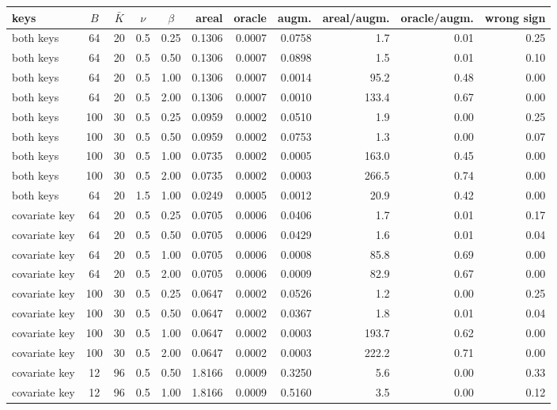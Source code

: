 \documentclass[11pt]{article}
\theoremstyle{definition}
\begin{document}
\begin{table}[t]\centering\footnotesize\setlength{\tabcolsep}{4pt}
\begin{tabular}{lcccc rrr rrr}\toprule
keys & $B$ & $\bar K$ & $\nu$ & $\beta$ & areal & oracle & augm. & areal/augm. & oracle/augm. & wrong sign\\\midrule
both keys & 64 & 20 & 0.5 & 0.25 & 0.1306 & 0.0007 & 0.0758 & 1.7 & 0.01 & 0.25\\
both keys & 64 & 20 & 0.5 & 0.50 & 0.1306 & 0.0007 & 0.0898 & 1.5 & 0.01 & 0.10\\
both keys & 64 & 20 & 0.5 & 1.00 & 0.1306 & 0.0007 & 0.0014 & 95.2 & 0.48 & 0.00\\
both keys & 64 & 20 & 0.5 & 2.00 & 0.1306 & 0.0007 & 0.0010 & 133.4 & 0.67 & 0.00\\
both keys & 100 & 30 & 0.5 & 0.25 & 0.0959 & 0.0002 & 0.0510 & 1.9 & 0.00 & 0.25\\
both keys & 100 & 30 & 0.5 & 0.50 & 0.0959 & 0.0002 & 0.0753 & 1.3 & 0.00 & 0.07\\
both keys & 100 & 30 & 0.5 & 1.00 & 0.0735 & 0.0002 & 0.0005 & 163.0 & 0.45 & 0.00\\
both keys & 100 & 30 & 0.5 & 2.00 & 0.0735 & 0.0002 & 0.0003 & 266.5 & 0.74 & 0.00\\
both keys & 64 & 20 & 1.5 & 1.00 & 0.0249 & 0.0005 & 0.0012 & 20.9 & 0.42 & 0.00\\
covariate key & 64 & 20 & 0.5 & 0.25 & 0.0705 & 0.0006 & 0.0406 & 1.7 & 0.01 & 0.17\\
covariate key & 64 & 20 & 0.5 & 0.50 & 0.0705 & 0.0006 & 0.0429 & 1.6 & 0.01 & 0.04\\
covariate key & 64 & 20 & 0.5 & 1.00 & 0.0705 & 0.0006 & 0.0008 & 85.8 & 0.69 & 0.00\\
covariate key & 64 & 20 & 0.5 & 2.00 & 0.0705 & 0.0006 & 0.0009 & 82.9 & 0.67 & 0.00\\
covariate key & 100 & 30 & 0.5 & 0.25 & 0.0647 & 0.0002 & 0.0526 & 1.2 & 0.00 & 0.25\\
covariate key & 100 & 30 & 0.5 & 0.50 & 0.0647 & 0.0002 & 0.0367 & 1.8 & 0.01 & 0.04\\
covariate key & 100 & 30 & 0.5 & 1.00 & 0.0647 & 0.0002 & 0.0003 & 193.7 & 0.62 & 0.00\\
covariate key & 100 & 30 & 0.5 & 2.00 & 0.0647 & 0.0002 & 0.0003 & 222.2 & 0.71 & 0.00\\
covariate key & 12 & 96 & 0.5 & 0.50 & 1.8166 & 0.0009 & 0.3250 & 5.6 & 0.00 & 0.33\\
covariate key & 12 & 96 & 0.5 & 1.00 & 1.8166 & 0.0009 & 0.5160 & 3.5 & 0.00 & 0.12\\

\end{tabular}
\end{table}
\end{document}
